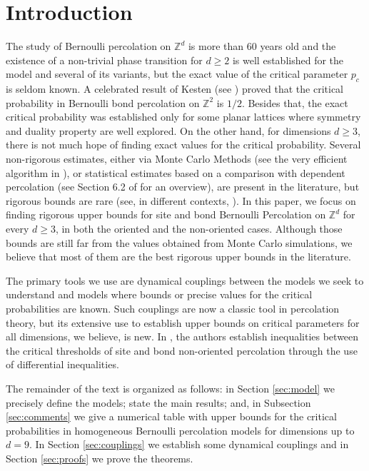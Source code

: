 \documentclass{aptpub}
\newcommand{\Z}{\mathbb{Z}}
\begin{document}
\section{Introduction} The study of Bernoulli  percolation on $\Z^d$ is more than 60 years old and the existence of a non-trivial phase transition for $d\geq 2$ is well established for the model and several of its variants, but the exact value of the critical parameter $p_c$ is seldom known. A celebrated result of Kesten (see \cite{K3}) proved that the critical probability in Bernoulli bond percolation on $\Z^2$ is $1/2$. Besides that, the exact critical probability was established only for some planar lattices where symmetry and duality property are well explored.  
On the other hand, for dimensions $d\geq 3$, there is not much hope of finding exact values for the critical probability. Several non-rigorous estimates, either via Monte Carlo Methods (see the very efficient algorithm in \cite{NZ}), or statistical estimates based on a comparison with dependent percolation (see Section 6.2 of \cite{BR} for an overview), are present in the literature, but rigorous bounds are rare (see, in different contexts, \cite {CR, L,W,WP}). In this paper, we focus on finding rigorous upper bounds for site and bond Bernoulli Percolation on $\Z^d$ for every $d\geq 3$, in both the oriented and the non-oriented cases. Although those bounds are still far from the values obtained from Monte Carlo simulations, we believe that most of them are the best rigorous upper bounds in the literature. 


The primary tools we use are dynamical couplings between the models we seek to understand and models where bounds or precise values for the critical probabilities are known.  Such couplings are now a classic tool in percolation theory, but its extensive use to establish upper bounds on critical parameters for all dimensions, we believe, is new. In \cite{CS}, the authors establish inequalities between the critical thresholds of site and bond non-oriented percolation through the use of differential inequalities.

The remainder of the text is organized as follows: in Section \ref{sec:model} we  precisely define the models; state the main results; and, in Subsection \ref{sec:comments} we give a numerical table with upper bounds for the critical probabilities in homogeneous Bernoulli percolation models for dimensions up to $d=9$. In Section \ref{sec:couplings} we establish some dynamical couplings and in Section \ref{sec:proofs} we prove the theorems.
\end{document}
